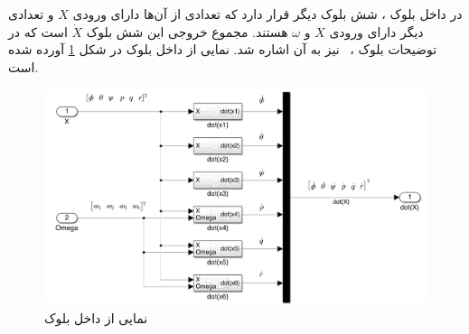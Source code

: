 در داخل بلوک
،
شش بلوک دیگر قرار دارد که تعدادی از آن‌ها دارای ورودی $X$ و تعدادی دیگر دارای ورودی $X$ و $\omega$ هستند. مجموع خروجی این شش بلوک $\dot X$ است که در توضیحات بلوک
،
 نیز به آن اشاره شد.
نمایی از داخل بلوک
در شکل \ref{all-six} آورده شده است.
\begin{figure}[H]
	\includegraphics[width=16cm]{../Figures/QuadSimulation/all-six.png}
	\centering
	\caption{نمایی از داخل بلوک }
	\label{all-six}
\end{figure}
